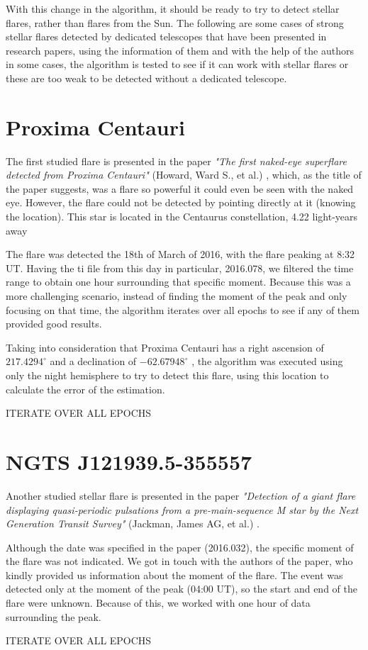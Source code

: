 With this change in the algorithm, it should be ready to try to detect stellar flares, rather than flares from the Sun. The following are some cases of strong stellar flares detected by dedicated telescopes that have been presented in research papers, using the information of them and with the help of the authors in some cases, the algorithm is tested to see if it can work with stellar flares or these are too weak to be detected without a dedicated telescope. 

\section{Proxima Centauri}

The first studied flare is presented in the paper \textit{"The first naked-eye superflare detected from Proxima Centauri"} (Howard, Ward S., et al.) \cite{howard2018first}, which, as the title of the paper suggests, was a flare so powerful it could even be seen with the naked eye. However, the flare could not be detected by pointing directly at it (knowing the location). This star is located in the Centaurus constellation, 4.22 light-years away

The flare was detected the 18th of March of 2016, with the flare peaking at 8:32 UT. Having the ti file from this day in particular, 2016.078, we filtered the time range to obtain one hour surrounding that specific moment. Because this was a more challenging scenario, instead of finding the moment of the peak and only focusing on that time, the algorithm iterates over all epochs to see if any of them provided good results.

Taking into consideration that Proxima Centauri has a right ascension of $217.4294^{\circ}$ and a declination of $-62.67948^{\circ}$ \cite{proximawiki}, the algorithm was executed using only the night hemisphere to try to detect this flare, using this location to calculate the error of the estimation.

ITERATE OVER ALL EPOCHS

\section{NGTS J121939.5-355557}

Another studied stellar flare is presented in the paper \textit{"Detection of a giant flare displaying quasi-periodic pulsations from a pre-main-sequence M star by the Next Generation Transit Survey"} (Jackman, James AG, et al.) \cite{jackman2018detection}. 

Although the date was specified in the paper (2016.032), the specific moment of the flare was not indicated. We got in touch with the authors of the paper, who kindly provided us information about the moment of the flare. The event was detected only at the moment of the peak (04:00 UT), so the start and end of the flare were unknown. Because of this, we worked with one hour of data surrounding the peak.

ITERATE OVER ALL EPOCHS



